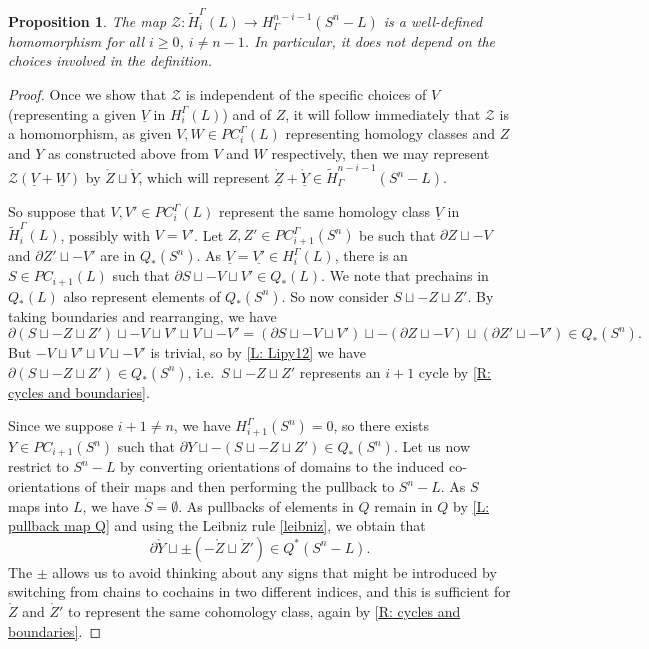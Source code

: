 \documentclass[12pt]{article}
\theoremstyle{plain}
\newtheorem{proposition}[theorem]{Proposition}
\theoremstyle{definition}
\theoremstyle{remark}
\newcommand{\uW}{\underline{W}}
\newcommand{\uV}{\underline{V}}
\newcommand{\td}[1]{\tilde{#1}}
\newcommand{\mr}[1]{\mathring{#1}}
\newcommand{\bd}{\partial}
\newcommand{\mc}[1]{\mathcal{#1}}
\begin{document}
\begin{proposition}
The map $\mc Z \colon \td H_i^\Gamma(L) \to H^{n-i-1}_\Gamma(S^n-L)$ is a well-defined homomorphism for all $i \geq 0$, $i \neq n-1$.
In particular, it does not depend on the choices involved in the definition.
\end{proposition}
\begin{proof}
Once we show that $\mc Z$ is independent of the specific choices of $V$ (representing a given $\uV$ in $H_i^\Gamma(L)$) and of $Z$, it will follow immediately that $\mc Z$ is a homomorphism, as given $V,W\in PC_i^\Gamma(L)$ representing homology classes and $Z$ and $Y$ as constructed above from $V$ and $W$ respectively, then we may represent $\mc Z(\uV + \uW)$ by $\mr Z \sqcup \mr Y$, which will represent $\underline{\mr Z}+\underline{\mr Y}\in \td H^{n-i-1}_\Gamma(S^n-L)$.

So suppose that $V,V' \in PC_i^\Gamma(L)$ represent the same homology class $\uV$ in $\td H_i^\Gamma(L)$, possibly with $V = V'$.
Let $Z,Z' \in PC_{i+1}^\Gamma(S^n)$ be such that $\bd Z \sqcup -V$ and $\bd Z' \sqcup -V'$ are in $Q_*(S^n)$.
As $\uV=\underline{V'} \in H_i^\Gamma(L)$, there is an $S \in PC_{i+1}(L)$ such that $\bd S \sqcup -V \sqcup V' \in Q_*(L)$.
We note that prechains in $Q_*(L)$ also represent elements of $Q_*(S^n)$.
So now consider $S \sqcup -Z \sqcup Z'$.
By taking boundaries and rearranging, we have $$\bd (S \sqcup -Z \sqcup Z')\sqcup -V \sqcup V' \sqcup V \sqcup -V' = (\bd S \sqcup -V \sqcup V')\sqcup -(\bd Z \sqcup -V) \sqcup (\bd Z'\sqcup -V')\in Q_*(S^n).$$
But  $-V \sqcup V' \sqcup V \sqcup -V'$ is trivial, so by \cref{L: Lipy12} we have $\bd(S \sqcup -Z \sqcup Z')\in Q_*(S^n)$, i.e.\ $S \sqcup -Z \sqcup Z'$ represents an $i+1$ cycle by \cref{R: cycles and boundaries}.

Since we suppose $i+1\neq n$, we have $H_{i+1}^\Gamma(S^n) = 0$, so there exists $Y \in PC_{i+1}(S^n)$ such that $\bd Y \sqcup -(S \sqcup -Z \sqcup Z') \in Q_*(S^n)$.
Let us now restrict to $S^n-L$ by converting orientations of domains to the induced co-orientations of their maps and then performing the pullback to $S^n-L$.
As $S$ maps into $L$, we have $\mr S = \emptyset$.
As pullbacks of elements in $Q$ remain in $Q$ by \cref{L: pullback map Q} and using the Leibniz rule \cref{leibniz}, we obtain that $$\bd \mr Y \sqcup \pm (-\mr Z \sqcup \mr Z') \in Q^*(S^n-L).$$
The $\pm$ allows us to avoid thinking about any signs that might be introduced by switching from chains to cochains in two different indices, and this is sufficient for $\mr Z$ and $\mr Z'$ to represent the same cohomology class, again by \cref{R: cycles and boundaries}.
\end{proof}
\end{document}
